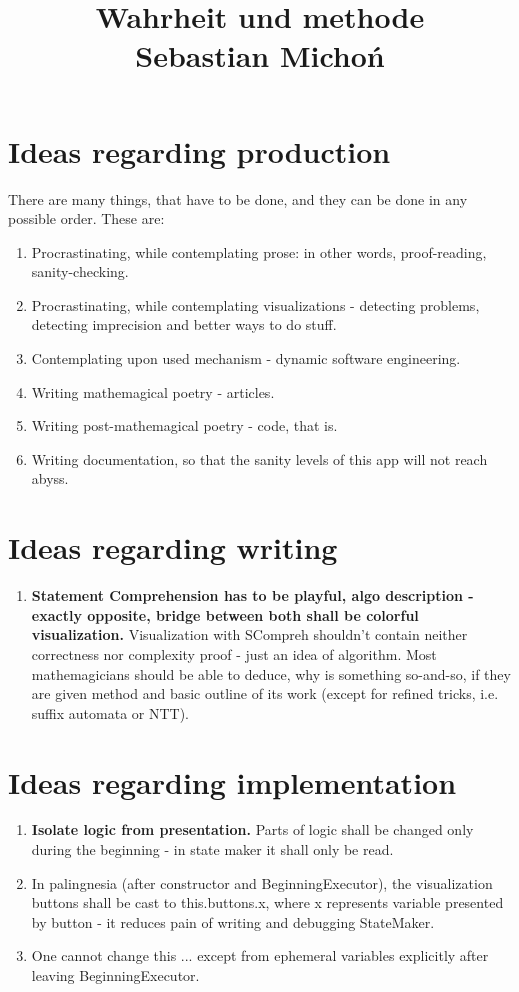 \documentclass[12pt]{article}
\begin{document}
\title{Wahrheit und methode\\
\large Sebastian Michoń}
\date{\vspace{-10ex}}
\maketitle

\section {Ideas regarding production}
There are many things, that have to be done, and they can be done in any possible order. These are:
\begin{enumerate}
	\item Procrastinating, while contemplating prose: in other words, proof-reading, sanity-checking.
	\item Procrastinating, while contemplating visualizations - detecting problems, detecting imprecision and better ways to do stuff.
	\item Contemplating upon used mechanism - dynamic software engineering.
	\item Writing mathemagical poetry - articles.
	\item Writing post-mathemagical poetry - code, that is.
	\item Writing documentation, so that the sanity levels of this app will not reach abyss.
\end{enumerate}

\section {Ideas regarding writing}
\begin{enumerate}
	\item \textbf{Statement Comprehension has to be playful, algo description - exactly opposite, bridge between both shall be colorful visualization.} Visualization with SCompreh shouldn't contain neither correctness nor complexity proof - just an idea of algorithm. Most mathemagicians should be able to deduce, why is something so-and-so, if they are given method and basic outline of its work (except for refined tricks, i.e. suffix automata or NTT).
\end{enumerate}

\section {Ideas regarding implementation}
\begin{enumerate}
	\item \textbf{Isolate logic from presentation.} Parts of logic shall be changed only during the beginning - in state maker it shall only be read.
	\item In palingnesia (after constructor and BeginningExecutor), the visualization buttons shall be cast to this.buttons.x, where x represents variable presented by button - it reduces pain of writing and debugging StateMaker.
	\item One cannot change this ... except from ephemeral variables explicitly after leaving BeginningExecutor.
\end{enumerate}
\end{document}
